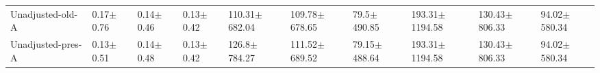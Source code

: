 \begin{tabular}{llllllllll}
Unadjusted-old-A    &           0.17$\pm$0.76 &           0.14$\pm$0.46 &           0.13$\pm$0.42 &          110.31$\pm$682.04 &          109.78$\pm$678.65 &            79.5$\pm$490.85 &      193.31$\pm$1194.58 &       130.43$\pm$806.33 &        94.02$\pm$580.34 \\
Unadjusted-pres-A   &           0.13$\pm$0.51 &           0.14$\pm$0.48 &           0.13$\pm$0.42 &           126.8$\pm$784.27 &          111.52$\pm$689.52 &           79.15$\pm$488.64 &      193.31$\pm$1194.58 &       130.43$\pm$806.33 &        94.02$\pm$580.34 \\
\bottomrule
\end{tabular}
